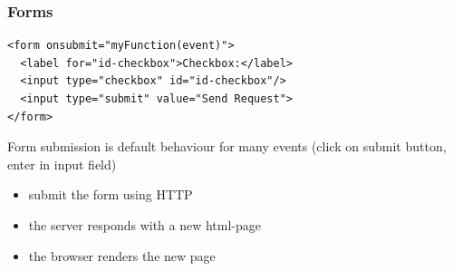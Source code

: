 \begin{frame}[fragile]
\frametitle{Forms}
\color{structure}

\begin{lstlisting}[style=htmlcssjs]
<form onsubmit="myFunction(event)">
  <label for="id-checkbox">Checkbox:</label>
  <input type="checkbox" id="id-checkbox"/>
  <input type="submit" value="Send Request">
</form>
\end{lstlisting}

Form submission is default behaviour for many events (click on submit button, enter in input field)
\begin{itemize}
  \item submit the form using HTTP
  \item the server responds with a new html-page
  \item the browser renders the new page
\end{itemize}

\end{frame}
